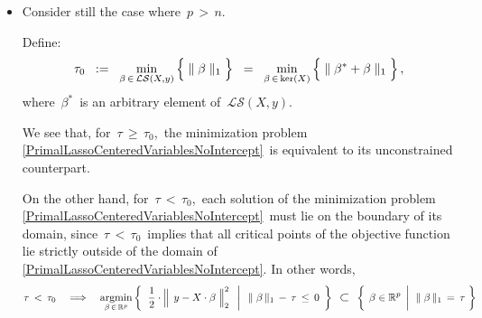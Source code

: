 \begin{itemize}
\item
	Consider still the case where \,{\color{red}$p \,>\, n$}.
	
	\vskip 0.2cm
	Define:
	\begin{equation*}
	\tau_{0}
	\;\; := \;\;
		\underset{\beta\,\in\,\mathcal{LS}(X,y)}{\min}
		\left\{\;
			\Vert\; \overset{{\color{white}.}}{\beta} \;\Vert_{1}
			\;\right\}
	\;\; = \;\;
		\underset{\beta\,\in\,\ker(X)}{\min}
		\left\{\;
			\Vert\; \beta^{*} + \overset{{\color{white}.}}{\beta} \;\Vert_{1}
			\;\right\},
	\end{equation*}
	where \,$\beta^{*}$\, is an arbitrary element of \,$\mathcal{LS}(X,y)$.
	
	\vskip 0.2cm
	We see that, for \,$\tau \,\geq\, \tau_{0}$,\, the minimization problem
	\,\eqref{PrimalLassoCenteredVariablesNoIntercept}\,
	is equivalent to its unconstrained counterpart.

	\vskip 0.2cm
	On the other hand, for \,$\tau \,<\, \tau_{0}$,\, each solution of the minimization problem
	\,\eqref{PrimalLassoCenteredVariablesNoIntercept}\,
	must lie on the boundary of its domain,
	since \,$\tau \,<\, \tau_{0}$\, implies that
	all critical points of the objective function lie strictly outside
	of the domain of \,\eqref{PrimalLassoCenteredVariablesNoIntercept}.
	In other words,
	{\color{red}\begin{equation*}
	\tau \,<\, \tau_{0}
	\quad\Longrightarrow\quad
		\underset{\beta\,\in\,\Re^{p}}{\argmin}
		\left\{\;\,
			\left.
			\dfrac{1}{2}
			\cdot
			\left\Vert\;\, y \overset{{\color{white}.}}{-} X\cdot\beta \;\right\Vert_{2}^{2}
			\;\;\,\right\vert\;\;
			\Vert\;\beta\,\Vert_{1} \, - \, \tau \, \leq \, 0
			\,\;\right\}
		\;\;\textnormal{\large$\subset$}\;\;
		\left\{\;
			\left.
			\overset{{\color{white}1}}{\beta} \in \Re^{p}
			\;\,\right\vert\;\,
			\Vert\;\beta\,\Vert_{1} \, = \, \tau
			\;\right\}
	\end{equation*}}
\end{itemize}


